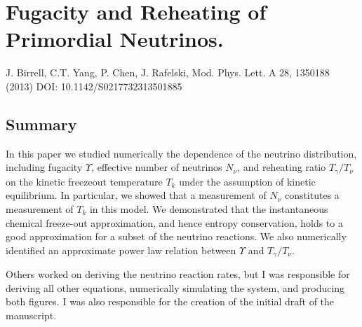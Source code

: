 \chapter{Fugacity and Reheating of Primordial Neutrinos.}\label{app:chem_freezeout}
J. Birrell, C.T. Yang, P. Chen, J. Rafelski, Mod. Phys. Lett. A 28, 1350188 (2013) 
DOI: 10.1142/S0217732313501885 

\section*{ Summary}

In this paper we studied numerically the dependence of the neutrino distribution, including fugacity $\Upsilon$, effective number of neutrinos $N_\nu$, and reheating ratio $T_\gamma/T_\nu$ on the kinetic freezeout temperature $T_k$ under the assumption of kinetic equilibrium. In particular, we showed that  a measurement of $N_\nu$ constitutes a measurement of $T_k$ in this model. We demonstrated that the instantaneous chemical freeze-out approximation, and hence entropy conservation,  holds to a good approximation for a subset of the neutrino reactions.  We also numerically identified an approximate power law relation between $\Upsilon$ and $T_\gamma/T_\nu$.

Others worked on deriving the neutrino reaction rates, but I was responsible for deriving all other equations, numerically simulating the system, and producing both figures. I was also responsible for the creation of the initial draft of the manuscript.
